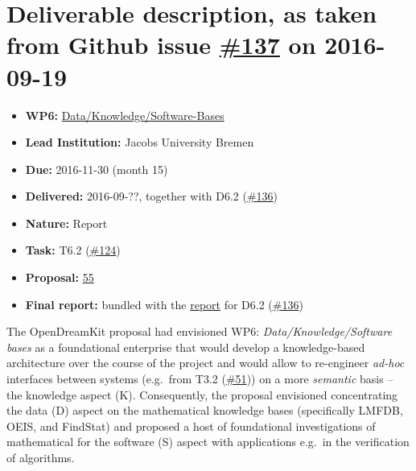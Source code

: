 \section*{\texorpdfstring{Deliverable description, as taken from Github
issue
\href{https://github.com/OpenDreamKit/OpenDreamKit/issues/137}{\#137} on
2016-09-19}{Deliverable description, as taken from Github issue \#137 on 2016-09-19}}\label{deliverable-description-as-taken-from-github-issue-137-on-2016-09-19}

\begin{itemize}
\tightlist
\item
  \textbf{WP6:}
  \href{https://github.com/OpenDreamKit/OpenDreamKit/tree/master/WP6}{Data/Knowledge/Software-Bases}
\item
  \textbf{Lead Institution:} Jacobs University Bremen
\item
  \textbf{Due:} 2016-11-30 (month 15)
\item
  \textbf{Delivered:} 2016-09-??, together with D6.2
  (\href{https://github.com/OpenDreamKit/OpenDreamKit/issues/136}{\#136})
\item
  \textbf{Nature:} Report
\item
  \textbf{Task:} T6.2
  (\href{https://github.com/OpenDreamKit/OpenDreamKit/issues/124}{\#124})
\item
  \textbf{Proposal:}
  \href{https://github.com/OpenDreamKit/OpenDreamKit/raw/master/Proposal/proposal-www.pdf}{55}
\item
  \textbf{Final report:} bundled with the
  \href{https://github.com/OpenDreamKit/OpenDreamKit/raw/master/WP6/D6.2/report-final.pdf}{report}
  for D6.2
  (\href{https://github.com/OpenDreamKit/OpenDreamKit/issues/136}{\#136})
\end{itemize}

The OpenDreamKit proposal had envisioned WP6:
\emph{Data/Knowledge/Software bases} as a foundational enterprise that
would develop a knowledge-based architecture over the course of the
project and would allow to re-engineer \emph{ad-hoc} interfaces between
systems (e.g.~from T3.2
(\href{https://github.com/OpenDreamKit/OpenDreamKit/issues/51}{\#51}))
on a more \emph{semantic} basis -- the knowledge aspect (K).
Consequently, the proposal envisioned concentrating the data (D) aspect
on the mathematical knowledge bases (specifically LMFDB, OEIS, and
FindStat) and proposed a host of foundational investigations of
mathematical for the software (S) aspect with applications e.g.~in the
verification of algorithms.

